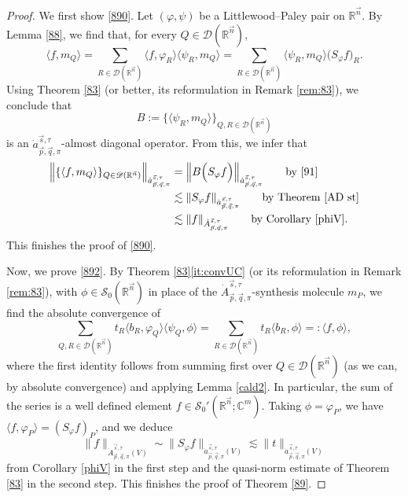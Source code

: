 \documentclass[11pt, reqno]{amsart}
\theoremstyle{definition}
\theoremstyle{remark}
\numberwithin{equation}{section}
\newcommand{\C}{\mathbb C}
\newcommand{\R}{\mathbb R}
\newcommand{\vn}{\vec n}
\newcommand{\vp}{\vec p}
\newcommand{\vq}{\vec q}
\newcommand{\vs}{\vec s}
\newcommand{\Atau}{\dot A^{\vs,\tau}_{\vp,\vq,\pi}}
\newcommand{\atau}{\dot a^{\vs,\tau}_{\vp,\vq,\pi}}
\begin{document}
\begin{proof}
We first show \eqref{890}.
Let $(\varphi,\psi)$ be a Littlewood--Paley pair on $\R^{\vn}$.
By Lemma \ref{88}, we find that, for every $Q\in\mathscr{D}(\R^{\vn})$,
\begin{equation}\label{91}
\langle f,m_Q\rangle
=\sum_{R\in\mathscr{D}(\R^{\vn})}
\langle f,\varphi_R\rangle
\langle\psi_R,m_Q\rangle
=\sum_{R\in\mathscr{D}(\R^{\vn})}
\langle\psi_R,m_Q\rangle
\Big(S_\varphi f\Big)_R.
\end{equation}
Using Theorem \ref{83} (or better, its reformulation in Remark \ref{rem:83}), we conclude that
$$B:=\{\langle\psi_R,m_Q\rangle\}_{Q,R\in\mathscr{D}(\R^{\vn})}$$
is an $\dot a^{\vec s,\tau}_{\vec p,\vec q,\pi}$-almost diagonal operator.
From this, we infer that
\begin{equation*}
\begin{split}
\Big\|\{\langle f,
m_Q\rangle\}_{Q\in\mathscr{D}(\mathbb R^{\vec n})}\Big\|_{\atau}
&=\Big\|B\Big(S_\varphi f\Big)\Big\|_{\atau}\qquad\text{by \eqref{91}} \\
&\lesssim\|S_\varphi f\|_{\atau}\qquad\text{by Theorem \ref{AD st}} \\
&\lesssim\| f\|_{\Atau}\qquad\text{by Corollary \ref{phiV}}.
\end{split}
\end{equation*}
This finishes the proof of \eqref{890}.

Now, we prove \eqref{892}. By Theorem \ref{83}\eqref{it:convUC} (or its reformulation in Remark \ref{rem:83}), with
$\phi\in\mathscr S_0(\R^{\vn})$ in place of the $\Atau$-synthesis molecule $m_P$,
we find the absolute convergence of
\begin{equation*}
\sum_{Q,R\in\mathscr D(\R^{\vn})} t_R\langle b_R,\varphi_Q\rangle\langle\psi_Q,\phi\rangle
=\sum_{R\in\mathscr D(\R^{\vn})} t_R\langle b_R,\phi\rangle
=:\langle f,\phi\rangle,
\end{equation*}
where the first identity follows from summing first over $Q\in\mathscr D(\R^{\vn})$
(as we can, by absolute convergence) and applying Lemma \ref{cald2}.
In particular, the sum of the series is a well defined element
$f\in\mathscr S_0'(\R^{\vn};\C^m)$. Taking $\phi=\varphi_P$,
we have $\langle  f,\varphi_P\rangle=(S_\varphi f)_P$, and we deduce
\begin{equation*}
\| f \|_{\Atau(V)}
\sim \|S_\varphi f\|_{\atau(V)}
\lesssim \|t\|_{\atau(V)}
\end{equation*}
from Corollary \ref{phiV} in the first step
and the quasi-norm estimate of Theorem \ref{83} in the second step.
This finishes the proof of Theorem \ref{89}.
\end{proof}
\end{document}
